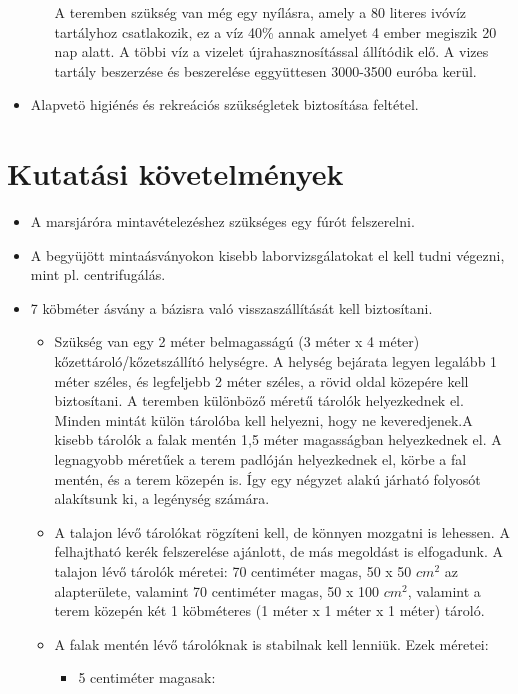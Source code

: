 \documentclass[12pt]{report}
\begin{document}
\begin{itemize}
\begin{itemize}
    A teremben szükség van még egy nyílásra, amely a 80 literes ivóvíz tartályhoz csatlakozik, ez a víz 40\% annak amelyet 4 ember megiszik 20 nap alatt. A többi víz a vizelet újrahasznosítással állítódik elő. A vizes tartály beszerzése és beszerelése eggyüttesen 3000-3500 euróba kerül.  
  \end{itemize}  
  \item Alapvetö higiénés és rekreációs szükségletek biztosítása feltétel. 
\end{itemize}
\section{Kutatási követelmények}
\begin{itemize}
  \item {} A marsjáróra mintavételezéshez szükséges egy fúrót felszerelni.
  \item {} A begyüjött mintaásványokon kisebb laborvizsgálatokat el kell tudni végezni, mint pl. centrifugálás.
    \item {} 7 köbméter ásvány a bázisra való visszaszállítását kell biztosítani.
  \begin{itemize}
      \item Szükség van egy 2 méter belmagasságú (3 méter x 4 méter) kőzettároló/kőzetszállító helységre. A helység bejárata legyen legalább 1 méter széles, és legfeljebb 2 méter széles, a rövid oldal közepére kell biztosítani. A teremben különböző méretű tárolók helyezkednek el. Minden mintát külön tárolóba kell helyezni, hogy ne keveredjenek.A kisebb tárolók a falak mentén 1,5 méter magasságban helyezkednek el. A legnagyobb méretűek a terem padlóján helyezkednek el, körbe a fal mentén, és a terem közepén is. Így egy négyzet alakú járható folyosót alakítsunk ki, a legénység számára. 
      \item A talajon lévő tárolókat rögzíteni kell, de könnyen mozgatni is lehessen. A felhajtható kerék felszerelése ajánlott, de más megoldást is elfogadunk. A talajon lévő tárolók méretei: 70 centiméter magas, 50 x 50 $cm^2$ az alapterülete, valamint 70 centiméter magas, 50 x 100 $cm^2$, valamint a terem közepén két 1 köbméteres (1 méter x 1 méter x 1 méter) tároló.
      \item A falak mentén lévő tárolóknak is stabilnak kell lenniük. Ezek méretei:
      \begin{itemize}
          \item 5 centiméter magasak: \\

\end{itemize}
\end{itemize}
\end{itemize}
\end{document}
